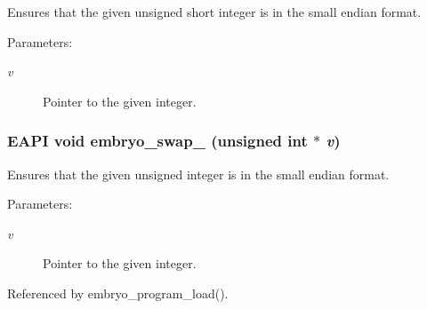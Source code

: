 Ensures that the given unsigned short integer is in the small endian format. 

\begin{Desc}
\item[Parameters:]
\begin{description}
\item[{\em v}]Pointer to the given integer. \end{description}
\end{Desc}
\hypertarget{group__Embryo__Swap__Group_g9131c33a606c33dbe1dd8a2632567cdf}{
\subsubsection{\setlength{\rightskip}{0pt plus 5cm}EAPI void embryo\_\-swap\_ (unsigned int $\ast$ {\em v})}}
\label{group__Embryo__Swap__Group_g9131c33a606c33dbe1dd8a2632567cdf}


Ensures that the given unsigned integer is in the small endian format. 

\begin{Desc}
\item[Parameters:]
\begin{description}
\item[{\em v}]Pointer to the given integer. \end{description}
\end{Desc}


Referenced by embryo\_\-program\_\-load().